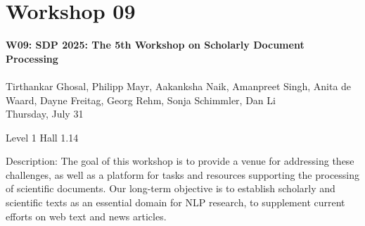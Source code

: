 \clearpage


\section[W09: SDP 2025: The 5th Workshop on Scholarly Document Processing]{Workshop 09}
\label{workshop_9}

\begin{center}
    {\Large \textbf{W09: SDP 2025: The 5th Workshop on Scholarly Document Processing}}\\
\\

    Tirthankar Ghosal, Philipp Mayr, Aakanksha Naik, Amanpreet Singh, Anita de Waard, Dayne Freitag, Georg Rehm, Sonja Schimmler, Dan Li\\

    Thursday, July 31
    
    Level 1 Hall 1.14

\end{center}

Description: The goal of this workshop is to provide a venue for addressing these challenges, as well as a platform for tasks and resources supporting the processing of scientific documents. Our long-term objective is to establish scholarly and scientific texts as an essential domain for NLP research, to supplement current efforts on web text and news articles.

